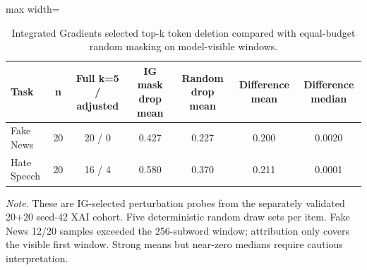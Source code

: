 \begin{table}[t]
\centering
\caption{Integrated Gradients selected top-k token deletion compared with equal-budget random masking on model-visible windows.}
\label{tab:ig_random}
\footnotesize
\begin{adjustbox}{max width=\linewidth}
\begin{tabular}{lcccccc}
\toprule
Task & n & Full k=5 / adjusted & IG mask drop mean & Random drop mean & Difference mean & Difference median \\
\midrule
Fake News & 20 & 20 / 0 & 0.427 & 0.227 & 0.200 & 0.0020 \\
Hate Speech & 20 & 16 / 4 & 0.580 & 0.370 & 0.211 & 0.0001 \\
\bottomrule
\end{tabular}
\end{adjustbox}
\par\vspace{2pt}
\begin{minipage}{\linewidth}
\scriptsize\emph{Note.} These are IG-selected perturbation probes from the separately validated 20+20 seed-42 XAI cohort. Five deterministic random draw sets per item. Fake News 12/20 samples exceeded the 256-subword window; attribution only covers the visible first window. Strong means but near-zero medians require cautious interpretation.
\end{minipage}
\end{table}

